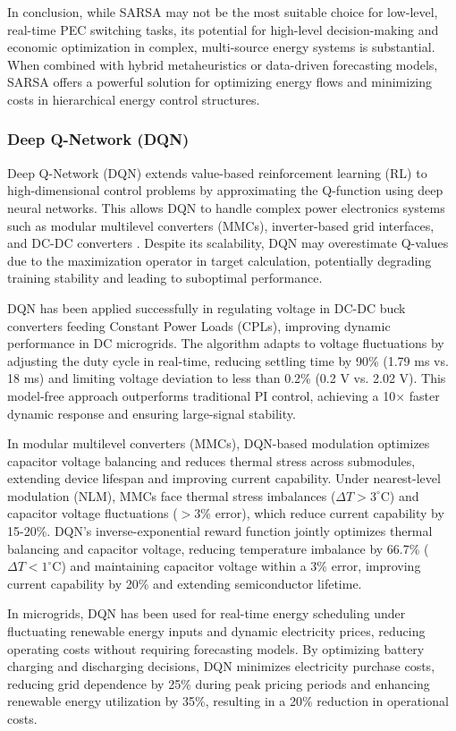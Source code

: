 In conclusion, while SARSA may not be the most suitable choice for low-level, real-time PEC switching tasks, its potential for high-level decision-making and economic optimization in complex, multi-source energy systems is substantial. When combined with hybrid metaheuristics or data-driven forecasting models, SARSA offers a powerful solution for optimizing energy flows and minimizing costs in hierarchical energy control structures.

\subsubsection{Deep Q-Network (DQN)}

Deep Q-Network (DQN) extends value-based reinforcement learning (RL) to high-dimensional control problems by approximating the Q-function using deep neural networks. This allows DQN to handle complex power electronics systems such as modular multilevel converters (MMCs), inverter-based grid interfaces, and DC-DC converters \cite{van2016deep}. Despite its scalability, DQN may overestimate Q-values due to the maximization operator in target calculation, potentially degrading training stability and leading to suboptimal performance.

DQN has been applied successfully in regulating voltage in DC-DC buck converters feeding Constant Power Loads (CPLs), improving dynamic performance in DC microgrids. The algorithm adapts to voltage fluctuations by adjusting the duty cycle in real-time, reducing settling time by 90\% (1.79 ms vs. 18 ms) and limiting voltage deviation to less than 0.2\% (0.2 V vs. 2.02 V). This model-free approach outperforms traditional PI control, achieving a 10$\times$ faster dynamic response and ensuring large-signal stability.

In modular multilevel converters (MMCs), DQN-based modulation optimizes capacitor voltage balancing and reduces thermal stress across submodules, extending device lifespan and improving current capability. Under nearest-level modulation (NLM), MMCs face thermal stress imbalances ($\Delta T > 3^\circ$C) and capacitor voltage fluctuations ($>$3\% error), which reduce current capability by 15-20\%. DQN's inverse-exponential reward function jointly optimizes thermal balancing and capacitor voltage, reducing temperature imbalance by 66.7\% ($\Delta T < 1^\circ$C) and maintaining capacitor voltage within a 3\% error, improving current capability by 20\% and extending semiconductor lifetime.

In microgrids, DQN has been used for real-time energy scheduling under fluctuating renewable energy inputs and dynamic electricity prices, reducing operating costs without requiring forecasting models. By optimizing battery charging and discharging decisions, DQN minimizes electricity purchase costs, reducing grid dependence by 25\% during peak pricing periods and enhancing renewable energy utilization by 35\%, resulting in a 20\% reduction in operational costs.

